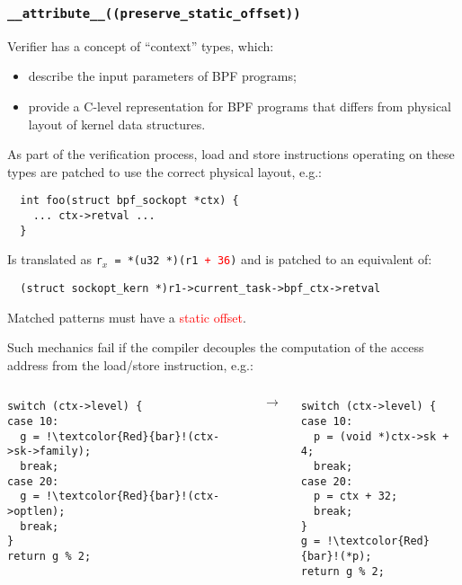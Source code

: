 \documentclass{beamer}
\newcommand{\code}[1]{\texttt{#1}}
\begin{document}
\begin{frame}
  \frametitle{\large\code{\_\_attribute\_\_((preserve\_static\_offset))}}

  Verifier has a concept of ``context'' types, which:
  \begin{itemize}
  \item describe the input parameters of BPF programs;
  \item provide a C-level representation for BPF programs that differs
    from physical layout of kernel data structures.
  \end{itemize}

  As part of the verification process, load and store instructions
  operating on these types are patched to use the correct physical
  layout, e.g.:

  \begin{verbatim}
  int foo(struct bpf_sockopt *ctx) {
	... ctx->retval ...      
  }
  \end{verbatim}

  Is translated as \code{r$_x$ = *(u32 *)(r1 \textcolor{Red}{+ 36})} and is
  patched to an equivalent of:

  \begin{verbatim}
  (struct sockopt_kern *)r1->current_task->bpf_ctx->retval
  \end{verbatim}

  Matched patterns must have a \textcolor{Red}{static offset}.

  \framebreak

  Such mechanics fail if the compiler decouples the computation of the
  access address from the load/store instruction, e.g.:

  \begin{columns}
    \begin{verbatim}
switch (ctx->level) {
case 10:
  g = !\textcolor{Red}{bar}!(ctx->sk->family);
  break;
case 20:
  g = !\textcolor{Red}{bar}!(ctx->optlen);
  break;
}
return g % 2;
    \end{verbatim}

    $\rightarrow$

    \begin{verbatim}
switch (ctx->level) {
case 10:
  p = (void *)ctx->sk + 4;
  break;
case 20:
  p = ctx + 32;
  break;
}
g = !\textcolor{Red}{bar}!(*p);
return g % 2;
    \end{verbatim}
  \end{columns}


\end{frame}
\end{document}
